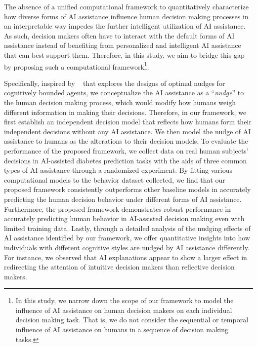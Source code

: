 \documentclass[letterpaper]{article} %
\begin{document}
The absence of a unified computational framework to quantitatively characterize how diverse forms of AI assistance influence human decision making processes in an interpretable way impedes the further intelligent utilization of AI assistance. As such, decision makers often have to interact with the default forms of AI assistance instead of benefiting from personalized and intelligent AI assistance that can best support them. 
Therefore, in this study, we aim to bridge this gap by proposing such a computational framework\footnote{In this study, we narrow down the scope of our framework to model the influence of AI assistance on human decision makers on each individual decision making task. That is, we do not consider the sequential or temporal influence of AI assistance on humans in a sequence of decision making tasks. 
}.


Specifically, inspired by \citeauthor{callaway2022optimal}~ that explores the designs of optimal nudges for cognitively bounded agents, we conceptualize the AI assistance as a ``{\em nudge}'' to the human decision making process, which would modify how humans weigh different information in making their decisions. 
Therefore, in our framework, we first establish an independent decision model that reflects how humans form their independent decisions without any AI assistance. We then model the nudge of AI assistance to humans as the alterations to their decision models.
To evaluate the performance of the proposed framework, we collect data on real human subjects' decisions in AI-assisted diabetes prediction tasks with the aids of three common types of AI assistance through a randomized experiment. By fitting various computational models to the behavior dataset collected, we find that our proposed framework consistently outperforms other baseline models in accurately predicting the human decision behavior under different forms of AI assistance. Furthermore, 
the proposed framework demonstrates robust performance in accurately predicting human behavior in AI-assisted decision making even with limited training data. Lastly, through a detailed analysis of the nudging effects of AI assistance identified by our framework, we offer quantitative insights into how individuals with different cognitive styles are nudged by AI assistance differently. For instance, we observed that 
AI explanations appear to show a larger effect in redirecting the attention of intuitive
decision makers than reflective decision makers.  
\end{document}
